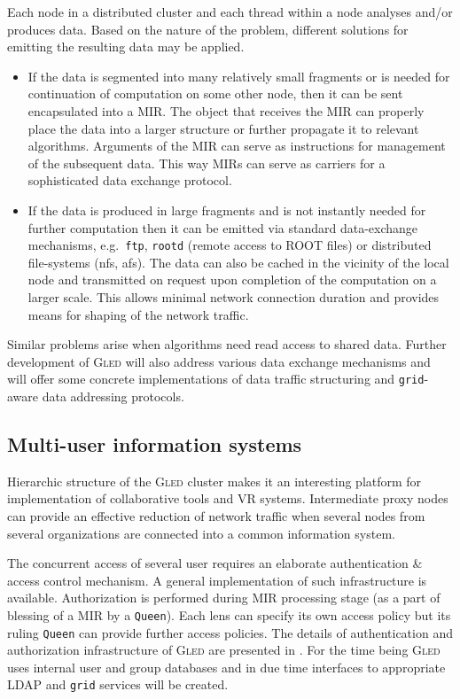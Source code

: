 \documentclass[a4paper,11pt]{article}
\def\gled{\textsc{Gled}\xspace}
\def\grid{\texttt{grid}\xspace}
\def\smalltt#1{{\small\texttt{#1}}}
\begin{document}
Each node in a distributed cluster and each thread within a node
analyses and/or produces data. Based on the nature of the problem,
different solutions for emitting the resulting data may be applied.
\begin{itemize}
\item If the data is segmented into many relatively small fragments or
  is needed for continuation of computation on some other node, then
  it can be sent encapsulated into a MIR. The object that
  receives the MIR can properly place the data into a larger structure or
  further propagate it to relevant algorithms. Arguments of the MIR
  can serve as instructions for management of the subsequent data.
  This way MIRs can serve as carriers for a sophisticated data
  exchange protocol.
\item If the data is produced in large fragments and is not
  instantly needed for further computation then it can be emitted via
  standard data-exchange mechanisms, e.g.\  \smalltt{ftp},
  \smalltt{rootd} (remote access to ROOT files) or distributed
  file-systems (nfs, afs). The data can also be cached in the vicinity
  of the local node and transmitted on request upon completion of the
  computation on a larger scale. This allows minimal network
  connection duration and provides means for shaping of the network
  traffic.
\end{itemize}
Similar problems arise when algorithms need read access to shared
data. Further development of \gled will also address various data
exchange mechanisms and will offer some concrete implementations of
data traffic structuring and \grid-aware data addressing protocols.

\subsection{Multi-user information systems}

Hierarchic structure of the \gled cluster makes it an interesting
platform for implementation of collaborative tools and VR systems.
Intermediate proxy nodes can provide an effective reduction of network
traffic when several nodes from several organizations are connected
into a common information system.

The concurrent access of several user requires an elaborate
authentication \& access control mechanism. A general implementation
of such infrastructure is available. Authorization is performed during
MIR processing stage (as a part of blessing of a MIR by a
\smalltt{Queen}). Each lens can specify its own access policy but its
ruling \smalltt{Queen} can provide further access policies.
The details of authentication and authorization infrastructure of
\gled are presented in \cite{gled.auth}.
For the time being \gled uses internal user and group databases and in
due time interfaces to appropriate LDAP and \grid services will be
created.
\end{document}
